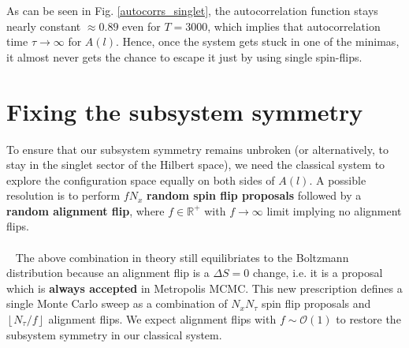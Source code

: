 \documentclass[../thesis_main.tex]{subfiles}
\begin{document}
As can be seen in Fig. \ref{autocorrs_singlet}, the autocorrelation function stays nearly constant $\approx 0.89$ even for $T = 3000$, which implies that autocorrelation time $\boxed{\tau \to \infty}$ for $A(l)$. Hence, once the system gets stuck in one of the minimas, it almost never gets the chance to escape it just by using single spin-flips. 

\section{Fixing the subsystem symmetry}
To ensure that our subsystem symmetry remains unbroken (or alternatively, to stay in the singlet sector of the Hilbert space), we need the classical system to explore the configuration space equally on both sides of $A(l)$. A possible resolution is to perform ${f N_x}$  \textbf{random spin flip proposals} followed by a \textbf{random alignment flip}, where $f \in \mathbb{R}^+$ with $f \to \infty$ limit implying no alignment flips.\\~\\~
The above combination in theory still equilibriates to the Boltzmann distribution because an alignment flip is a $\Delta S = 0$ change, i.e. it is a proposal which is \textbf{always accepted} in Metropolis MCMC. This new prescription defines a single Monte Carlo sweep as a combination of $N_x N_\tau$ spin flip proposals and $\left\lfloor N_\tau/f \right\rfloor$ alignment flips. We expect alignment flips with $f \sim \mathcal{O}(1)$ to restore the subsystem symmetry in our classical system.
\end{document}
